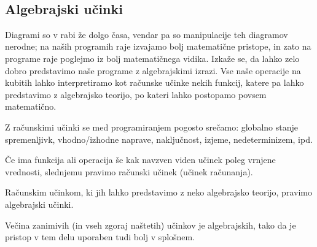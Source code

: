\begin{prooftree}[center=false]
\end{prooftree}\\
\begin{prooftree}[center=false]
\end{prooftree}\quad
\begin{prooftree}[center=false]
\end{prooftree}

\subsection{Algebrajski učinki}

Diagrami so v rabi že dolgo časa, vendar pa so manipulacije teh diagramov nerodne;
na naših programih raje izvajamo bolj matematične pristope, in zato na programe raje poglejmo iz bolj matematičnega vidika. Izkaže se, da lahko zelo dobro predstavimo naše programe z algebrajskimi izrazi.
Vse naše operacije na kubitih lahko interpretiramo kot računske učinke nekih funkcij, katere pa lahko predstavimo z algebrajsko teorijo, po kateri lahko postopamo povsem matematično.

Z računskimi učinki se med programiranjem pogosto srečamo: globalno stanje spremenljivk, vhodno/izhodne naprave, naključnost, izjeme, nedeterminizem, ipd.

\begin{definition}
    Če ima funkcija ali operacija še kak navzven viden učinek poleg vrnjene vrednosti, slednjemu pravimo računski učinek (učinek računanja).
\end{definition}

\begin{definition}
    Računskim učinkom, ki jih lahko predstavimo z neko algebrajsko teorijo, pravimo algebrajski učinki.
\end{definition}

Večina zanimivih (in vseh zgoraj naštetih) učinkov je algebrajskih, tako da je pristop v tem delu uporaben tudi bolj v splošnem.



